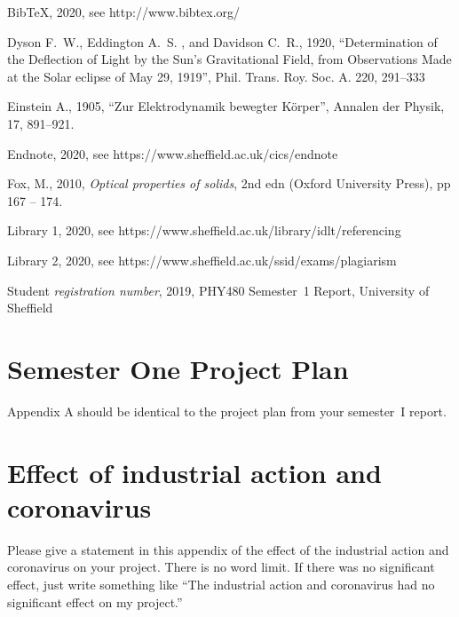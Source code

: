 \documentclass[a4paper,fleqn,usenatbib]{mnras}
\begin{document}
\begin{thebibliography}{99}


BibTeX, 2020, see http://www.bibtex.org/ 

Dyson F.~W., Eddington A.~S. , and Davidson C.~R., 1920, ``Determination of the Deflection of Light by the Sun's Gravitational Field, from Observations Made at the Solar eclipse of May 29, 1919'', Phil. Trans. Roy. Soc. A. 220, 291--333 

Einstein A., 1905, ``Zur Elektrodynamik bewegter K\"{o}rper'', Annalen der Physik, 17, 891--921.

Endnote, 2020, see https://www.sheffield.ac.uk/cics/endnote

Fox, M., 2010, \textit{Optical properties of solids}, 2nd edn (Oxford University Press), pp 167 -- 174.

Library 1, 2020, see https://www.sheffield.ac.uk/library/idlt/referencing

Library 2, 2020, see https://www.sheffield.ac.uk/ssid/exams/plagiarism

Student \textit{registration number}, 2019, PHY480 Semester~1 Report, University of Sheffield

\end{thebibliography}


\appendix

\section{Semester One Project Plan}
\label{App:project plan}
Appendix A  should be identical to the project plan from your semester~I report. 

\section{Effect of industrial action and coronavirus}
\label{2020 special}
Please give a statement in this appendix of the effect of the industrial action and coronavirus on your project. There is no word limit. If there was no significant effect, just write something like ``The industrial action and coronavirus had no significant effect on my project.''
\end{document}
